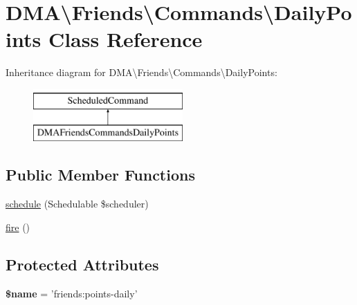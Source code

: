 \hypertarget{classDMA_1_1Friends_1_1Commands_1_1DailyPoints}{\section{D\+M\+A\textbackslash{}Friends\textbackslash{}Commands\textbackslash{}Daily\+Points Class Reference}
\label{classDMA_1_1Friends_1_1Commands_1_1DailyPoints}
}
Inheritance diagram for D\+M\+A\textbackslash{}Friends\textbackslash{}Commands\textbackslash{}Daily\+Points\+:\begin{figure}[H]
\begin{center}
\leavevmode
\includegraphics[height=2.000000cm]{da/d3a/classDMA_1_1Friends_1_1Commands_1_1DailyPoints}
\end{center}
\end{figure}
\subsection*{Public Member Functions}
\begin{DoxyCompactItemize}
\item 
\hyperlink{classDMA_1_1Friends_1_1Commands_1_1DailyPoints_a9b86a3c5fd799e43cf001ae955501c0c}{schedule} (Schedulable \$scheduler)
\item 
\hyperlink{classDMA_1_1Friends_1_1Commands_1_1DailyPoints_a744a2cce8db836d1e2ae4db904361b1e}{fire} ()
\end{DoxyCompactItemize}
\subsection*{Protected Attributes}
\begin{DoxyCompactItemize}
\item 
\hypertarget{classDMA_1_1Friends_1_1Commands_1_1DailyPoints_affe8b91e4538363d05401b06b59ec6b0}{{\bfseries \$name} = 'friends\+:points-\/daily'}\label{classDMA_1_1Friends_1_1Commands_1_1DailyPoints_affe8b91e4538363d05401b06b59ec6b0}

\end{DoxyCompactItemize}


